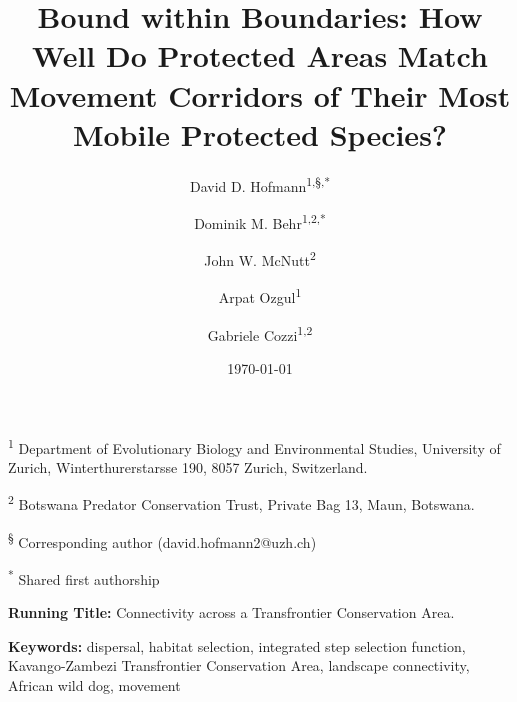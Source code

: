 \documentclass[abstract=on,10pt,a4paper,bibliography=totocnumbered]{article}
\title{Bound within Boundaries: How Well Do Protected Areas Match Movement
Corridors of Their Most Mobile Protected Species?}
\author{
  David D. Hofmann\textsuperscript{1,\S,*} \and
  Dominik M. Behr\textsuperscript{1,2,*} \and
  John W. McNutt\textsuperscript{2} \and
  Arpat Ozgul\textsuperscript{1} \and
  Gabriele Cozzi\textsuperscript{1,2}
}
\date{\today}
\begin{document}



\maketitle

\begin{flushleft}

\vspace{0.5cm}

\textsuperscript{1} Department of Evolutionary Biology and Environmental
Studies, University of Zurich, Winterthurerstarsse 190, 8057 Zurich,
Switzerland.

\textsuperscript{2} Botswana Predator Conservation Trust, Private Bag 13, Maun,
Botswana.

\textsuperscript{\S} Corresponding author (david.hofmann2@uzh.ch)

\textsuperscript{*} Shared first authorship

\vspace{4cm}

\textbf{Running Title:} Connectivity across a Transfrontier Conservation Area.

\vspace{0.5cm}

\textbf{Keywords:} dispersal, habitat selection, integrated step selection
function, Kavango-Zambezi Transfrontier Conservation Area, landscape
connectivity, African wild dog, movement

\end{flushleft}
\end{document}

